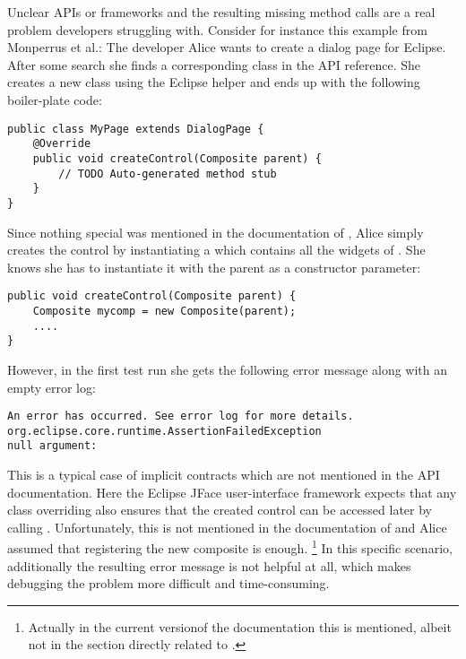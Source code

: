 Unclear APIs or frameworks and the resulting missing method calls are a real problem developers struggling with.
Consider for instance this example from Monperrus et al.\cite{monperrus2010detecting}:
The developer Alice wants to create a dialog page for Eclipse.
After some search she finds a corresponding class  in the API reference.
She creates a new class using the Eclipse helper and ends up with the following boiler-plate code:
\begin{lstlisting}
public class MyPage extends DialogPage {
    @Override
    public void createControl(Composite parent) {
        // TODO Auto-generated method stub
    }
}
\end{lstlisting}
Since nothing special was mentioned in the documentation of , Alice simply creates the control by instantiating a  which contains all the widgets of .
She knows she has to instantiate it with the parent as a constructor parameter:
\begin{lstlisting}
public void createControl(Composite parent) {
    Composite mycomp = new Composite(parent);
    ....
}
\end{lstlisting}
However, in the first test run she gets the following error message along with an empty error log:
\begin{lstlisting}
An error has occurred. See error log for more details.
org.eclipse.core.runtime.AssertionFailedException
null argument:
\end{lstlisting}
This is a typical case of implicit contracts which are not mentioned in the API documentation.
Here the Eclipse JFace user-interface framework expects that any class overriding  also ensures that the created control can be accessed later by calling .
Unfortunately, this is not mentioned in the documentation of  and Alice assumed that registering the new composite is enough.%
\footnote{Actually in the current version\footnotemark of the documentation this is mentioned, albeit not in the section directly related to .}
In this specific scenario, additionally the resulting error message is not helpful at all, which makes debugging the problem more difficult and time-consuming.


